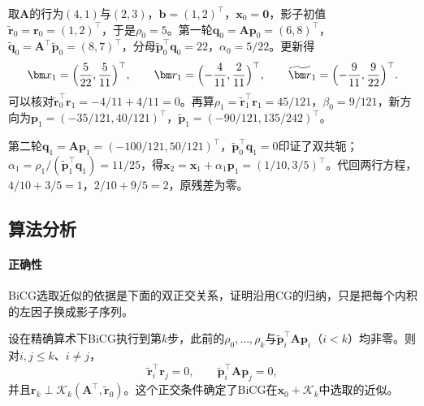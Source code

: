 \begin{example}[非对称二阶系统上的BiCG]
\label{ex:ls-bicg-two-steps}
取$\bm A$的行为$(4,1)$与$(2,3)$，$\bm b=(1,2)^\top$，$\bm x_0=\bm0$，影子初值$\widetilde{\bm r}_0=\bm r_0=(1,2)^\top$，于是$\rho_0=5$。第一轮$\bm q_0=\bm A\bm p_0=(6,8)^\top$，$\widetilde{\bm q}_0=\bm A^\top\widetilde{\bm p}_0=(8,7)^\top$，分母$\widetilde{\bm p}_0^\top\bm q_0=22$，$\alpha_0=5/22$。更新得
\[
 \bm x_1=\Bigl(\frac5{22},\frac5{11}\Bigr)^\top,\qquad
 \bm r_1=\Bigl(-\frac4{11},\frac2{11}\Bigr)^\top,\qquad
 \widetilde{\bm r}_1=\Bigl(-\frac9{11},\frac9{22}\Bigr)^\top .
\]
可以核对$\widetilde{\bm r}_0^\top\bm r_1=-4/11+4/11=0$。再算$\rho_1=\widetilde{\bm r}_1^\top\bm r_1=45/121$，$\beta_0=9/121$，新方向为$\bm p_1=(-35/121,40/121)^\top$，$\widetilde{\bm p}_1=(-90/121,135/242)^\top$。

第二轮$\bm q_1=\bm A\bm p_1=(-100/121,50/121)^\top$，$\widetilde{\bm p}_0^\top\bm q_1=0$印证了双共轭；$\alpha_1=\rho_1/(\widetilde{\bm p}_1^\top\bm q_1)=11/25$，得$\bm x_2=\bm x_1+\alpha_1\bm p_1=(1/10,3/5)^\top$。代回两行方程，$4/10+3/5=1$，$2/10+9/5=2$，原残差为零。
\end{example}

\subsection{算法分析}

\paragraph{正确性}
BiCG选取近似的依据是下面的双正交关系，证明沿用CG的归纳，只是把每个内积的左因子换成影子序列。

\begin{theorem}[BiCG的双正交性]
\label{thm:ls-bicg-biorthogonality}
设在精确算术下BiCG执行到第$k$步，此前的$\rho_0,\ldots,\rho_k$与$\widetilde{\bm p}_i^\top\bm A\bm p_i$（$i<k$）均非零。则对$i,j\le k$、$i\ne j$，
\[
 \widetilde{\bm r}_i^\top\bm r_j=0,\qquad \widetilde{\bm p}_i^\top\bm A\bm p_j=0,
\]
并且$\bm r_k\perp\mathcal K_k(\bm A^\top,\widetilde{\bm r}_0)$。这个正交条件确定了BiCG在$\bm x_0+\mathcal K_k$中选取的近似。
\end{theorem}

